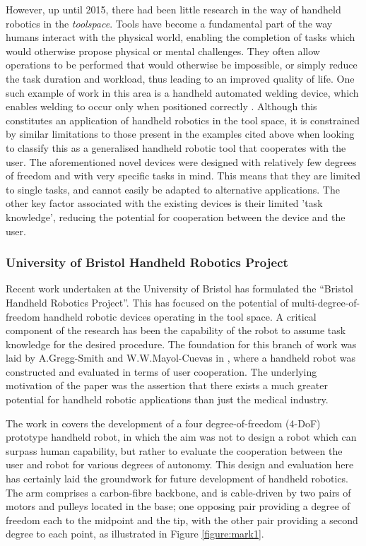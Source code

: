 \documentclass[11pt]{article}
\begin{document}
However, up until 2015, there had been little research in the way of handheld robotics in the \textit{toolspace}. Tools have become a fundamental part of the way humans interact with the physical world, enabling the completion of tasks which would otherwise propose physical or mental challenges. They often allow operations to be performed that would otherwise be impossible, or simply reduce the task duration and workload, thus leading to an improved quality of life. One such example of work in this area is a handheld automated welding device, which enables welding to occur only when positioned correctly \cite{Echtler2004}. Although this constitutes an application of handheld robotics in the tool space, it is constrained by similar limitations to those present in the examples cited above when looking to classify this as a generalised handheld robotic tool that cooperates with the user. The aforementioned novel devices were designed with relatively few degrees of freedom and with very specific tasks in mind. This means that they are limited to single tasks, and cannot easily be adapted to alternative applications. The other key factor associated with the existing devices is their limited 'task knowledge', reducing the potential for cooperation between the device and the user.

\subsubsection{University of Bristol Handheld Robotics Project} \label{bristolhandheld}
Recent work undertaken at the University of Bristol has formulated the “Bristol Handheld Robotics Project”. This has focused on the potential of multi-degree-of-freedom handheld robotic devices operating in the tool space. A critical component of the research has been the capability of the robot to assume task knowledge for the desired procedure. The foundation for this branch of work was laid by A.Gregg-Smith and W.W.Mayol-Cuevas in \cite{GreggSmithDesign}, where a handheld robot was constructed and evaluated in terms of user cooperation. The underlying motivation of the paper was the assertion that there exists a much greater potential for handheld robotic applications than just the medical industry.

The work in \cite{GreggSmithDesign} covers the development of a four degree-of-freedom (4-DoF) prototype handheld robot, in which the aim was not to design a robot which can surpass human capability, but rather to evaluate the cooperation between the user and robot for various degrees of autonomy. This design and evaluation here has certainly laid the groundwork for future development of handheld robotics. The arm comprises a carbon-fibre backbone, and is cable-driven by two pairs of motors and pulleys located in the base; one opposing pair providing a degree of freedom each to the midpoint and the tip, with the other pair providing a second degree to each point, as illustrated in Figure \ref{figure:mark1}.
\end{document}
